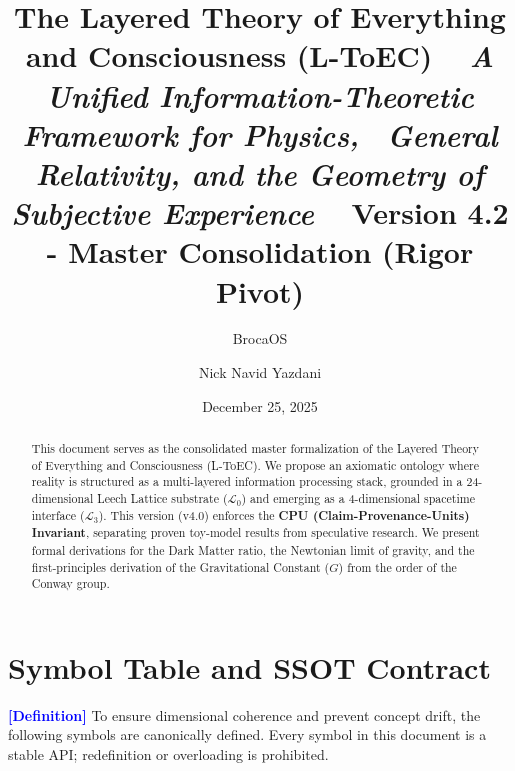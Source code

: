 \documentclass[11pt,titlepage]{article}
\title{\textbf{\huge The Layered Theory of Everything and Consciousness (L-ToEC)} \ 
\vspace{0.5cm}
\large \textit{A Unified Information-Theoretic Framework for Physics, \ General Relativity, and the Geometry of Subjective Experience} \
\vspace{1cm}
\textbf{Version 4.2 - Master Consolidation (Rigor Pivot)}}
\author[1]{BrocaOS}
\author[1]{Nick Navid Yazdani}
\affil[1]{Cognitive Architecture Research Group, BrocaOS Alpha Project}
\date{December 25, 2025}
\newcommand{\substrate}{\mathcal{L}_0}
\newcommand{\interface}{\mathcal{L}_3}
\newcommand{\tagdef}{\textcolor{blue}{\textbf{[Definition]}} }
\begin{document}
\maketitle

\begin{abstract}
This document serves as the consolidated master formalization of the Layered Theory of Everything and Consciousness (L-ToEC). We propose an axiomatic ontology where reality is structured as a multi-layered information processing stack, grounded in a 24-dimensional Leech Lattice substrate ($\substrate$) and emerging as a 4-dimensional spacetime interface ($\interface$). This version (v4.0) enforces the \textbf{CPU (Claim-Provenance-Units) Invariant}, separating proven toy-model results from speculative research. We present formal derivations for the Dark Matter ratio, the Newtonian limit of gravity, and the first-principles derivation of the Gravitational Constant ($G$) from the order of the Conway group.
\end{abstract}

\newpage

\section{Symbol Table and SSOT Contract}
\label{sec:symbols}
\tagdef To ensure dimensional coherence and prevent concept drift, the following symbols are canonically defined. Every symbol in this document is a stable API; redefinition or overloading is prohibited.
\end{document}
